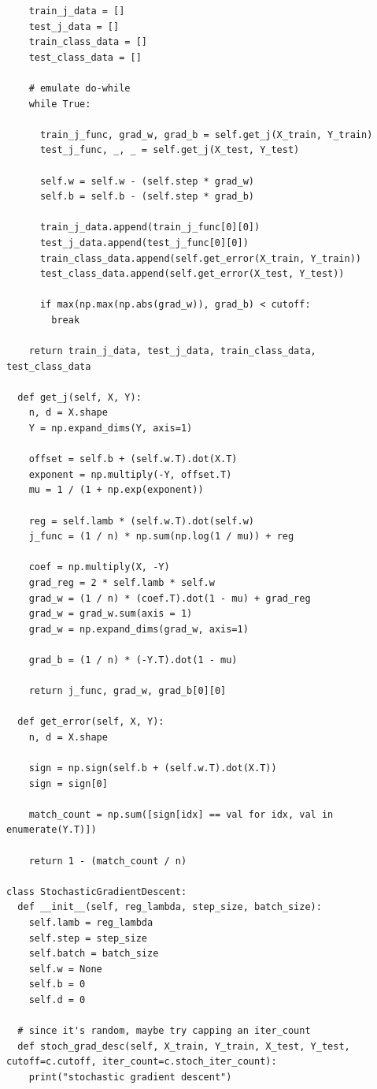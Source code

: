\documentclass{article}
\newcommand{\1}{\mathbf{1}}
\begin{document}
{\begin{verbatim}
    train_j_data = []
    test_j_data = []
    train_class_data = []
    test_class_data = []

    # emulate do-while
    while True:

      train_j_func, grad_w, grad_b = self.get_j(X_train, Y_train)
      test_j_func, _, _ = self.get_j(X_test, Y_test)

      self.w = self.w - (self.step * grad_w)
      self.b = self.b - (self.step * grad_b)

      train_j_data.append(train_j_func[0][0])
      test_j_data.append(test_j_func[0][0])
      train_class_data.append(self.get_error(X_train, Y_train))
      test_class_data.append(self.get_error(X_test, Y_test))

      if max(np.max(np.abs(grad_w)), grad_b) < cutoff:
        break

    return train_j_data, test_j_data, train_class_data, test_class_data

  def get_j(self, X, Y):
    n, d = X.shape
    Y = np.expand_dims(Y, axis=1)

    offset = self.b + (self.w.T).dot(X.T)
    exponent = np.multiply(-Y, offset.T)
    mu = 1 / (1 + np.exp(exponent))

    reg = self.lamb * (self.w.T).dot(self.w)
    j_func = (1 / n) * np.sum(np.log(1 / mu)) + reg

    coef = np.multiply(X, -Y)
    grad_reg = 2 * self.lamb * self.w
    grad_w = (1 / n) * (coef.T).dot(1 - mu) + grad_reg
    grad_w = grad_w.sum(axis = 1)
    grad_w = np.expand_dims(grad_w, axis=1)

    grad_b = (1 / n) * (-Y.T).dot(1 - mu)

    return j_func, grad_w, grad_b[0][0]

  def get_error(self, X, Y):
    n, d = X.shape

    sign = np.sign(self.b + (self.w.T).dot(X.T))
    sign = sign[0]

    match_count = np.sum([sign[idx] == val for idx, val in enumerate(Y.T)])

    return 1 - (match_count / n)

class StochasticGradientDescent:
  def __init__(self, reg_lambda, step_size, batch_size):
    self.lamb = reg_lambda
    self.step = step_size
    self.batch = batch_size
    self.w = None
    self.b = 0
    self.d = 0

  # since it's random, maybe try capping an iter_count
  def stoch_grad_desc(self, X_train, Y_train, X_test, Y_test, cutoff=c.cutoff, iter_count=c.stoch_iter_count):
    print("stochastic gradient descent")


\end{verbatim}}
\end{document}

